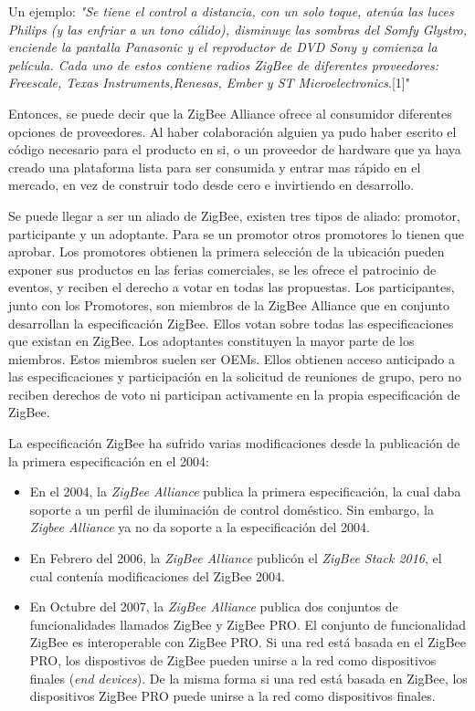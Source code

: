 \documentclass[10pt,journal,compsoc]{IEEEtran}
\begin{document}
  Un ejemplo: \emph{"Se tiene el control a distancia, con un solo toque, atenúa las luces Philips (y las
enfriar a un tono cálido), disminuye las sombras del Somfy Glystro, enciende la pantalla Panasonic
 y el reproductor de DVD Sony y comienza la película. Cada uno de estos contiene radios ZigBee de diferentes proveedores: Freescale, Texas Instruments,Renesas, Ember y ST Microelectronics}.[1]"
  
 Entonces, se puede decir que la ZigBee Alliance ofrece al consumidor diferentes opciones de proveedores. Al haber colaboración alguien ya pudo haber escrito el código necesario para el producto en si, o un proveedor de hardware que ya haya creado una plataforma lista para ser consumida y entrar mas rápido en el mercado, en vez de construir todo desde cero e invirtiendo en desarrollo.  
 
 Se puede llegar a ser un aliado de ZigBee, existen tres tipos de aliado: promotor, participante y un adoptante. 
 Para se un promotor otros promotores lo tienen que aprobar. Los promotores obtienen la primera selección de la ubicación pueden exponer sus productos en las ferias comerciales, se les ofrece el patrocinio de eventos, y reciben  el derecho a votar en todas las propuestas.
 Los participantes, junto con los Promotores, son miembros de la ZigBee Alliance que en conjunto desarrollan la 
 especificación ZigBee. Ellos votan sobre todas las especificaciones que existan en ZigBee. Los adoptantes constituyen la mayor parte de los miembros. Estos miembros suelen ser OEMs. Ellos obtienen acceso anticipado a las especificaciones y participación en la solicitud de reuniones de grupo, pero no reciben derechos de voto ni participan activamente en la propia especificación de ZigBee.

La especificación ZigBee ha sufrido varias modificaciones desde la publicación de la primera especificación en el 2004:
\begin{itemize}
    \item En el 2004, la \emph{ZigBee Alliance} publica la primera especificación, la cual daba soporte a un perfil de iluminación de control doméstico. Sin embargo, la \emph{Zigbee Alliance} ya no da soporte a la especificación del 2004.
    \item En Febrero del 2006, la \emph{ZigBee Alliance} publicón el \emph{ZigBee Stack 2016}, el cual contenía modificaciones del ZigBee 2004.
   \item En Octubre del 2007, la \emph{ZigBee Alliance} publica dos conjuntos de funcionalidades llamados ZigBee y ZigBee PRO. El conjunto de funcionalidad ZigBee es interoperable con ZigBee PRO. Si una red está basada en el ZigBee PRO, los dispostivos de ZigBee pueden unirse a la red como dispositivos finales (\emph{end devices}). De la misma forma si una red está basada en ZigBee, los dispositivos ZigBee PRO puede unirse a la red como dispositivos finales.
\end{itemize}
\end{document}

